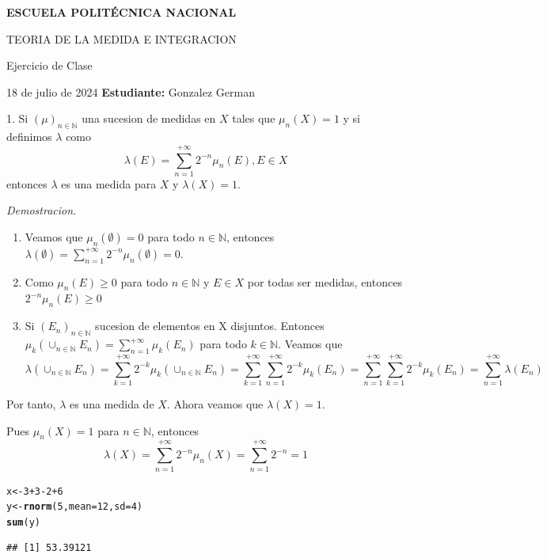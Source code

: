 \documentclass{article}\usepackage[]{graphicx}\usepackage[]{xcolor}
\makeatletter
\newcommand{\hlnum}[1]{\textcolor[rgb]{0.686,0.059,0.569}{#1}}%
\newcommand{\hlopt}[1]{\textcolor[rgb]{0,0,0}{#1}}%
\newcommand{\hldef}[1]{\textcolor[rgb]{0.345,0.345,0.345}{#1}}%
\newcommand{\hlkwb}[1]{\textcolor[rgb]{0.69,0.353,0.396}{#1}}%
\newcommand{\hlkwc}[1]{\textcolor[rgb]{0.333,0.667,0.333}{#1}}%
\newcommand{\hlkwd}[1]{\textcolor[rgb]{0.737,0.353,0.396}{\textbf{#1}}}%
\newenvironment{kframe}{%
 \def\at@end@of@kframe{}%
 \ifinner\ifhmode%
  \def\at@end@of@kframe{\end{minipage}}%
  \begin{minipage}{\columnwidth}%
 \fi\fi%
 \def\FrameCommand##1{\hskip\@totalleftmargin \hskip-\fboxsep
 \colorbox{shadecolor}{##1}\hskip-\fboxsep
     \hskip-\linewidth \hskip-\@totalleftmargin \hskip\columnwidth}%
 \MakeFramed {\advance\hsize-\width
   \@totalleftmargin\z@ \linewidth\hsize
   \@setminipage}}%
 {\par\unskip\endMakeFramed%
 \at@end@of@kframe}
\newenvironment{knitrout}{}{} %
\makeatother
\begin{document}
\hrulefill

\begin{center}
\textbf{ESCUELA POLITÉCNICA NACIONAL}

TEORIA DE LA MEDIDA E INTEGRACION
\end{center}
\begin{center}
    Ejercicio de Clase
\end{center}

18 de julio de 2024 \hfill \textbf{Estudiante:} Gonzalez German

\hrulefill

1. Si $(\mu)_{n \in \mathbb{N}}$ una sucesion de medidas en $X$ tales que $\mu_n(X)=1$ y si definimos $\lambda$ como $$\lambda(E)=\sum_{n=1}^{+\infty} 2^{-n} \mu_{n}(E) , E \in X$$
entonces $\lambda$ es una medida para $X$ y $\lambda(X)=1$.

\textit{Demostracion.} 
\begin{enumerate}
    \item Veamos que $\mu_n(\emptyset)=0$ para todo $n \in \mathbb{N}$, entonces $\lambda(\emptyset)=\sum_{n=1}^{+\infty} 2^{-n} \mu_{n}(\emptyset)=0$.
    \item Como $\mu_n(E) \geq 0$ para todo $n \in \mathbb{N}$ y $E \in X$ por todas ser medidas, entonces $2^{-n} \mu_n(E) \geq 0$
    \item Si $(E_n)_{n \in \mathbb{N}}$ sucesion de elementos en X disjuntos. Entonces $\mu_k (\cup_{n \in \mathbb{N}} E_n) = \sum_{n=1}^{+\infty} \mu_k (E_n)$ para todo $k\in \mathbb{N}$.
    Veamos que $$\lambda(\cup_{n \in \mathbb{N}} E_n)= \sum_{k=1}^{+\infty} 2^{-k} \mu_k (\cup_{n \in \mathbb{N}} E_n)=\sum_{k=1}^{+\infty} \sum_{n=1}^{+\infty} 2^{-k} \mu_k (E_n)=\sum_{n=1}^{+\infty} \sum_{k=1}^{+\infty}  2^{-k} \mu_k (E_n)= \sum_{n=1}^{+\infty} \lambda(E_n)$$
    
\end{enumerate}

Por tanto, $\lambda$ es una medida de $X$. Ahora veamos que $\lambda(X)=1$.

Pues $\mu_n(X)=1$ para $n\in \mathbb{N}$, entonces $$\lambda(X)=\sum_{n=1}^{+\infty} 2^{-n} \mu_n(X)= \sum_{n=1}^{+\infty} 2^{-n} =1$$ 

\begin{knitrout}
\color{fgcolor}\begin{kframe}
\begin{alltt}
\hldef{x} \hlkwb{<-} \hlnum{3}\hlopt{+}\hlnum{3}\hlopt{-}\hlnum{2}\hlopt{+}\hlnum{6}
\hldef{y} \hlkwb{<-} \hlkwd{rnorm}\hldef{(}\hlnum{5}\hldef{,}\hlkwc{mean}\hldef{=}\hlnum{12}\hldef{,}\hlkwc{sd}\hldef{=}\hlnum{4}\hldef{)}
\hlkwd{sum}\hldef{(y)}
\end{alltt}
\begin{verbatim}
## [1] 53.39121
\end{verbatim}
\end{kframe}
\end{knitrout}
\end{document}
